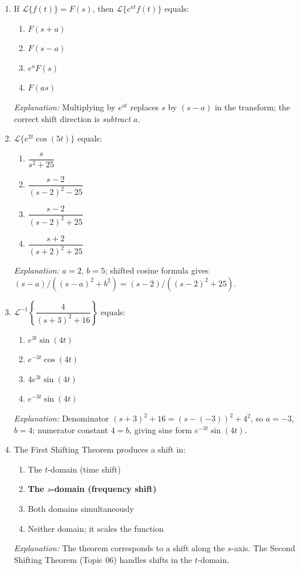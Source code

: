 \documentclass[12pt,a4paper]{article}
\begin{document}
\begin{enumerate}[label=\textbf{\arabic*.}, leftmargin=*, itemsep=1.5em]

\item If $\mathcal{L}\{f(t)\} = F(s)$, then $\mathcal{L}\{e^{at}f(t)\}$ equals:

\begin{enumerate}[label=(\alph*)]
  \item $F(s+a)$
  \item \textbf{$F(s-a)$}
  \item $e^{a}F(s)$
  \item $F(as)$
\end{enumerate}
\textit{Explanation:} Multiplying by $e^{at}$ replaces $s$ by $(s-a)$ in the transform; the correct shift direction is \emph{subtract} $a$.

\item $\mathcal{L}\{e^{2t}\cos(5t)\}$ equals:

\begin{enumerate}[label=(\alph*)]
  \item $\dfrac{s}{s^2+25}$
  \item $\dfrac{s-2}{(s-2)^2-25}$
  \item \textbf{$\dfrac{s-2}{(s-2)^2+25}$}
  \item $\dfrac{s+2}{(s+2)^2+25}$
\end{enumerate}
\textit{Explanation:} $a=2$, $b=5$; shifted cosine formula gives $(s-a)/((s-a)^2+b^2) = (s-2)/((s-2)^2+25)$.

\item $\mathcal{L}^{-1}\!\left\{\dfrac{4}{(s+3)^2+16}\right\}$ equals:

\begin{enumerate}[label=(\alph*)]
  \item $e^{3t}\sin(4t)$
  \item $e^{-3t}\cos(4t)$
  \item $4e^{3t}\sin(4t)$
  \item \textbf{$e^{-3t}\sin(4t)$}
\end{enumerate}
\textit{Explanation:} Denominator $(s+3)^2+16 = (s-(-3))^2+4^2$, so $a=-3$, $b=4$; numerator constant $4=b$, giving sine form $e^{-3t}\sin(4t)$.

\item The First Shifting Theorem produces a shift in:

\begin{enumerate}[label=(\alph*)]
  \item The $t$-domain (time shift)
  \item \textbf{The $s$-domain (frequency shift)}
  \item Both domains simultaneously
  \item Neither domain; it scales the function
\end{enumerate}
\textit{Explanation:} The theorem corresponds to a shift along the $s$-axis.
The Second Shifting Theorem (Topic 06) handles shifts in the $t$-domain.


\end{enumerate}
\end{document}
